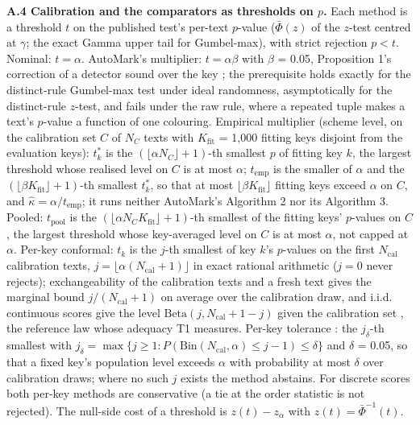 \documentclass[11pt,letterpaper]{article}
\begin{document}
\textbf{A.4 Calibration and the comparators as thresholds on \(p\).} Each method is a threshold \(t\) on the published test's per-text \(p\)-value (\(\bar\Phi(z)\) of the \(z\)-test centred at \(\gamma\); the exact Gamma upper tail for Gumbel-max), with strict rejection \(p < t\). Nominal: \(t = \alpha\). AutoMark's multiplier: \(t = \alpha\beta\) with \(\beta\) = 0.05, Proposition 1's correction of a detector sound over the key \citep{gloaguen2026automark}; the prerequisite holds exactly for the distinct-rule Gumbel-max test under ideal randomness, asymptotically for the distinct-rule \(z\)-test, and fails under the raw rule, where a repeated tuple makes a text's \(p\)-value a function of one colouring. Empirical multiplier (scheme level, on the calibration set \(C\) of \(N_C\) texts with \(K_{\mathrm{fit}}\) = 1,000 fitting keys disjoint from the evaluation keys): \(t^*_k\) is the \((\lfloor\alpha N_C\rfloor + 1)\)-th smallest \(p\) of fitting key \(k\), the largest threshold whose realised level on \(C\) is at most \(\alpha\); \(t_{\mathrm{emp}}\) is the smaller of \(\alpha\) and the \((\lfloor\beta K_{\mathrm{fit}}\rfloor + 1)\)-th smallest \(t^*_k\), so that at most \(\lfloor\beta K_{\mathrm{fit}}\rfloor\) fitting keys exceed \(\alpha\) on \(C\), and \(\hat\kappa = \alpha/t_{\mathrm{emp}}\); it runs neither AutoMark's Algorithm 2 nor its Algorithm 3. Pooled: \(t_{\mathrm{pool}}\) is the \((\lfloor\alpha N_C K_{\mathrm{fit}}\rfloor + 1)\)-th smallest of the fitting keys' \(p\)-values on \(C\), the largest threshold whose key-averaged level on \(C\) is at most \(\alpha\), not capped at \(\alpha\). Per-key conformal: \(t_k\) is the \(j\)-th smallest of key \(k\)'s \(p\)-values on the first \(N_{\mathrm{cal}}\) calibration texts, \(j = \lfloor\alpha(N_{\mathrm{cal}} + 1)\rfloor\) in exact rational arithmetic (\(j = 0\) never rejects); exchangeability of the calibration texts and a fresh text gives the marginal bound \(j/(N_{\mathrm{cal}} + 1)\) on average over the calibration draw, and i.i.d. continuous scores give the level \(\mathrm{Beta}(j, N_{\mathrm{cal}} + 1 - j)\) given the calibration set \citep{vovk2012conditional}, the reference law whose adequacy T1 measures. Per-key tolerance \citep[Proposition 2b]{vovk2012conditional}: the \(j_\delta\)-th smallest with \(j_\delta = \max\{j \ge 1 : P(\mathrm{Bin}(N_{\mathrm{cal}}, \alpha) \le j - 1) \le \delta\}\) and \(\delta\) = 0.05, so that a fixed key's population level exceeds \(\alpha\) with probability at most \(\delta\) over calibration draws; where no such \(j\) exists the method abstains. For discrete scores both per-key methods are conservative (a tie at the order statistic is not rejected). The null-side cost of a threshold is \(z(t) - z_\alpha\) with \(z(t) = \bar\Phi^{-1}(t)\).
\end{document}

